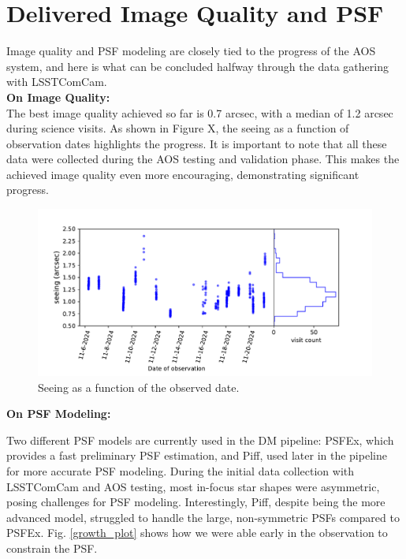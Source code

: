 \section{Delivered Image Quality and PSF}
\label{sec:delivered_image_quality_and_psf}


Image quality and PSF modeling are closely tied to the progress of the AOS system, and here is what can be concluded halfway through the data gathering with LSSTComCam. \\

\textbf{On Image Quality:} \\

The best image quality achieved so far is 0.7 arcsec, with a median of 1.2 arcsec during science visits. As shown in Figure X, the seeing as a function of observation dates highlights the progress. It is important to note that all these data were collected during the AOS testing and validation phase. This makes the achieved image quality even more encouraging, demonstrating significant progress.

\begin{figure}
        \centering
        \includegraphics[scale=0.47]{figures/seeing}
        \caption{\small Seeing as a function of the observed date.}
        \label{seeing_plot}
\end{figure}


\textbf{On PSF Modeling:}

Two different PSF models are currently used in the DM pipeline: PSFEx, which provides a fast preliminary PSF estimation, and Piff, used later in the pipeline for more accurate PSF modeling. During the initial data collection with LSSTComCam and AOS testing, most in-focus star shapes were asymmetric, posing challenges for PSF modeling. Interestingly, Piff, despite being the more advanced model, struggled to handle the large, non-symmetric PSFs compared to PSFEx. Fig. \ref{growth_plot} shows how we were able early in the observation to constrain the PSF.


